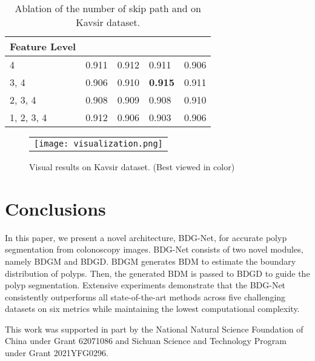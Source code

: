 \documentclass[]{spie}
\begin{document}
\begin{table}[ht]
\caption{Ablation of the number of skip path and  on Kavsir dataset.} 
\label{tab5}
\begin{center}       
\begin{tabular}{lllll}
\hline
\rule[-1ex]{0pt}{3.5ex} Feature Level &  &  &  & \\ 
\hline
\rule[-1ex]{0pt}{3.5ex} 4 & 0.911 & 0.912 & 0.911 & 0.906\\
\rule[-1ex]{0pt}{3.5ex} 3, 4 & 0.906 & 0.910 & \textbf{0.915} & 0.911\\
\rule[-1ex]{0pt}{3.5ex} 2, 3, 4 & 0.908 & 0.909 & 0.908 & 0.910\\
\rule[-1ex]{0pt}{3.5ex} 1, 2, 3, 4 & 0.912 & 0.906  & 0.903  & 0.906 \\ 
\hline
\end{tabular}
\end{center}
\end{table}


\begin{figure} [ht]
\begin{center}
\begin{tabular}{c} \texttt{[image: visualization.png]}
\end{tabular}
\end{center}
\caption[example]
{ \label{fig6} 
Visual results on Kavsir dataset. (Best viewed in color)}
\hspace{2cm}
\end{figure} 

\section{Conclusions}
In this paper, we present a novel architecture, BDG-Net, for accurate polyp segmentation from colonoscopy images. BDG-Net consists of two novel modules, namely BDGM and BDGD. BDGM generates BDM to estimate the boundary distribution of polyps. Then, the generated BDM is passed to BDGD to guide the polyp segmentation. Extensive experiments demonstrate that the BDG-Net consistently outperforms all state-of-the-art methods across ﬁve challenging datasets on six metrics while maintaining the lowest computational complexity.

\acknowledgments
This work was supported in part by the National Natural Science Foundation of China under Grant 62071086 and Sichuan Science and Technology Program under Grant 2021YFG0296.

  
\end{document}

